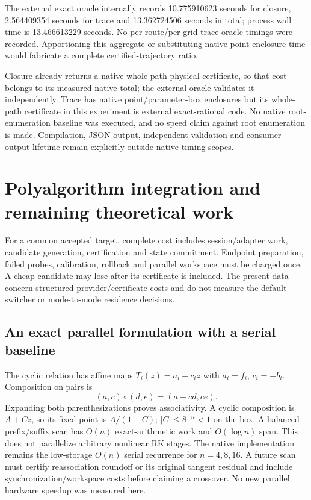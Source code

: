 \documentclass[aps,pra,reprint,onecolumn,10pt,notitlepage,nofootinbib]{revtex4-2}
\begin{document}
The external exact oracle internally records 10.775910623 seconds for closure,
2.564409354 seconds for trace and 13.362724506 seconds in total; process wall
time is 13.466613229 seconds. No per-route/per-grid trace oracle timings were
recorded. Apportioning this aggregate or substituting native point enclosure
time would fabricate a complete certified-trajectory ratio.

Closure already returns a native whole-path physical certificate, so that
cost belongs to its measured native total; the external oracle validates it
independently. Trace has native point/parameter-box enclosures but its
whole-path certificate in this experiment is external exact-rational code.
No native root-enumeration baseline was executed, and no speed claim against
root enumeration is made. Compilation, JSON output, independent validation
and consumer output lifetime remain explicitly outside native timing scopes.

\section{Polyalgorithm integration and remaining theoretical work}

For a common accepted target, complete cost includes session/adapter work,
candidate generation, certification and state commitment. Endpoint preparation,
failed probes, calibration, rollback and parallel workspace must be charged
once. A cheap candidate may lose after its certificate is included.
The present data concern structured provider/certificate costs and do not
measure the default switcher or mode-to-mode residence decisions.

\subsection{An exact parallel formulation with a serial baseline}

The cyclic relation has affine maps $T_i(z)=a_i+c_i z$ with $a_i=f_i$,
$c_i=-b_i$. Composition on pairs is
\begin{equation}
(a,c)\circ(d,e)=(a+cd,ce).
\end{equation}
Expanding both parenthesizations proves associativity. A cyclic composition
is $A+Cz$, so its fixed point is $A/(1-C)$; $|C|\le8^{-n}<1$ on the box.
A balanced prefix/suffix scan has $O(n)$ exact-arithmetic work and
$O(\log n)$ span. This does not parallelize arbitrary nonlinear RK stages.
The native implementation remains the low-storage $O(n)$ serial recurrence
for $n=4,8,16$. A future scan must certify reassociation roundoff or its
original tangent residual and include synchronization/workspace costs before
claiming a crossover. No new parallel hardware speedup was measured here.
\end{document}

